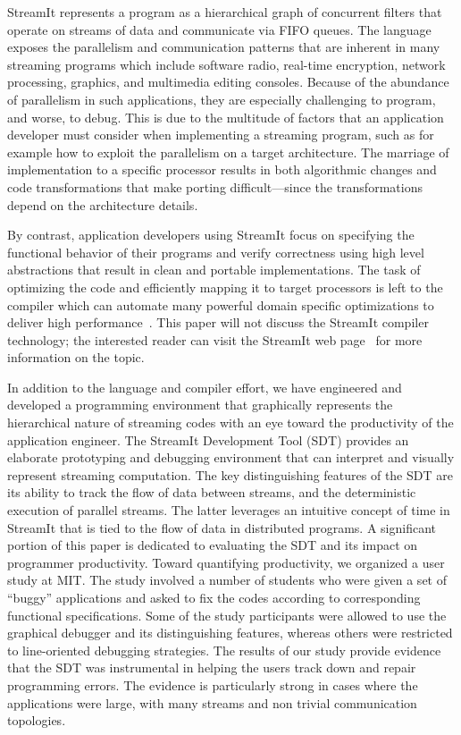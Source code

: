 \documentclass[times, 10pt,twocolumn]{article}
\begin{document}
StreamIt represents  a program as  a hierarchical graph  of concurrent
filters  that operate  on streams  of  data and  communicate via  FIFO
queues.    The  language  exposes   the     parallelism  and
communication patterns  that are  inherent in many  streaming programs
which   include   software   radio,  real-time   encryption,   network
processing, graphics, and multimedia editing consoles.  Because of the
abundance  of parallelism  in such  applications, they  are especially
challenging  to program,  and worse,  to debug.   This is  due  to the
multitude of factors that  an application developer must consider when
implementing a streaming  program, such as for example  how to exploit
the   parallelism  on   a  target   architecture.   The   marriage  of
implementation  to a  specific processor  results in  both algorithmic
changes and  code transformations that  make porting difficult---since
the transformations depend on the architecture details.

By contrast, application developers  using StreamIt focus on specifying
the functional behavior of their programs and verify correctness using
high   level  abstractions   that   result  in   clean  and   portable
implementations.   The task  of  optimizing the  code and  efficiently
mapping  it to target  processors is  left to  the compiler  which can
automate many  powerful domain specific optimizations  to deliver high
performance~\cite{linear, streambit}. This  paper will not discuss the
StreamIt  compiler technology;  the  interested reader  can visit  the
StreamIt  web  page~\cite{streamit-web} for  more  information on  the
topic.

In addition  to the language  and compiler effort, we  have engineered
and  developed a programming  environment that  graphically represents
the  hierarchical nature  of streaming  codes with  an eye  toward the
productivity  of the application  engineer.  The  StreamIt Development
Tool (SDT) provides an elaborate prototyping and debugging environment
that can  interpret and visually represent  streaming computation. The
key distinguishing  features of the SDT  are its ability  to track the
flow  of data  between  streams, and  the  deterministic execution  of
parallel streams. The latter leverages an intuitive concept of time in
StreamIt that is  tied to the flow of data  in distributed programs. A
significant portion of  this paper is dedicated to  evaluating the SDT
and  its   impact  on  programmer   productivity.  Toward  quantifying
productivity, we organized  a user study at MIT.  The study involved a
number of students who were  given a set of ``buggy'' applications and
asked  to   fix  the  codes  according   to  corresponding  functional
specifications. Some of the study participants were allowed to use the
graphical  debugger and  its distinguishing  features,  whereas others
were restricted to line-oriented  debugging strategies. The results of
our study  provide evidence that  the SDT was instrumental  in helping
the users  track down and  repair programming errors. The  evidence is
particularly strong  in cases where the applications  were large, with
many streams and non trivial communication topologies.
\end{document}
